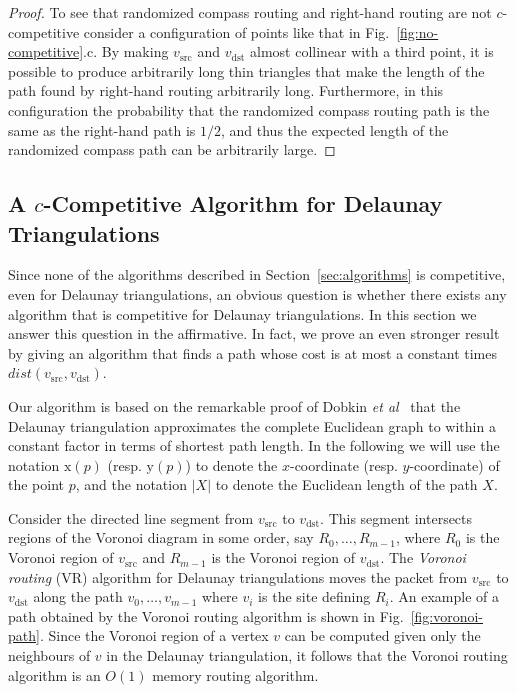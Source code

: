 \documentclass[final]{siamltex}
\newcommand{\etal}{{\em et al\/}}
\newcommand{\seclabel}[1]{\label{sec:#1}}
\newcommand{\secref}[1]{\mbox{Section~\ref{sec:#1}}}
\newcommand{\figref}[1]{\mbox{Fig.~\ref{fig:#1}}}
\newcommand{\x}{\mathrm{x}}
\newcommand{\y}{\mathrm{y}}
\newcommand{\dist}{\mathit{dist}}
\newcommand{\vsrc}{v_\mathrm{src}}
\newcommand{\vdest}{v_\mathrm{dst}}
\begin{document}
\begin{proof}
To see that randomized compass routing and right-hand routing are not
$c$-competitive consider a configuration of points like that in
\figref{no-competitive}.c.  By making $\vsrc$ and $\vdest$ almost
collinear with a third point, it is possible to produce arbitrarily
long thin triangles that make the length of the path found by
right-hand routing arbitrarily long.  Furthermore, in this
configuration the probability that the randomized compass routing path
is the same as the right-hand path is $1/2$, and thus the expected
length of the randomized compass path can be arbitrarily large.
\qquad\end{proof}


\subsection{A $c$-Competitive Algorithm for Delaunay 
	Triangulations}\seclabel{voronoi-path}

Since none of the algorithms described in \secref{algorithms} is
competitive, even for Delaunay triangulations, an obvious question is
whether there exists any algorithm that is competitive for Delaunay
triangulations.  In this section we answer this question in the
affirmative.  In fact, we prove an even stronger result by giving an
algorithm that finds a path whose cost is at most a constant times
$\dist(\vsrc,\vdest)$.

Our algorithm is based on the remarkable proof of Dobkin \etal\
\cite{dfs87} that the Delaunay triangulation approximates the complete
Euclidean graph to within a constant factor in terms of shortest path
length.  In the following we will use the notation $\x(p)$
(resp. $\y(p)$) to denote the $x$-coordinate (resp. $y$-coordinate) of
the point $p$, and the notation $|X|$ to denote the Euclidean length
of the path $X$.

Consider the directed line segment from $\vsrc$ to $\vdest$.  This
segment intersects regions of the Voronoi diagram in some order, say
$R_0,\ldots,R_{m-1}$, where $R_0$ is the Voronoi region of $\vsrc$ and
$R_{m-1}$ is the Voronoi region of $\vdest$.  The {\em Voronoi
routing\/} (VR) algorithm for Delaunay triangulations moves the packet
from $\vsrc$ to $\vdest$ along the path $v_0,\ldots,v_{m-1}$ where
$v_i$ is the site defining $R_i$.  An example of a path obtained by
the Voronoi routing algorithm is shown in \figref{voronoi-path}.  Since
the Voronoi region of a vertex $v$ can be computed given only the
neighbours of $v$ in the Delaunay triangulation, it follows that the
Voronoi routing algorithm is an $O(1)$ memory routing algorithm.
\end{document}
